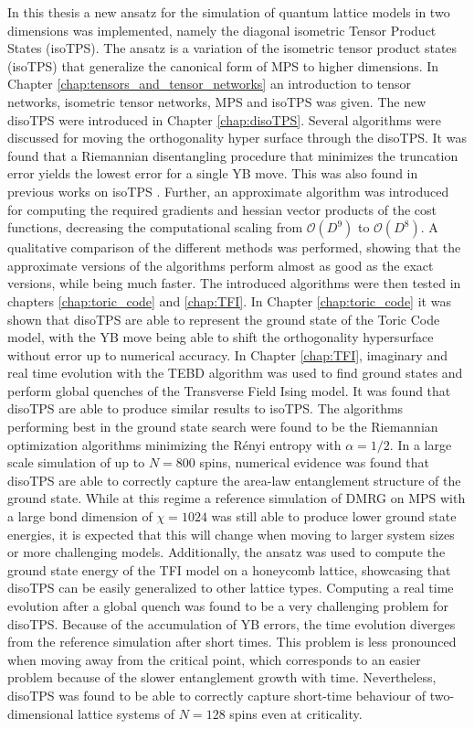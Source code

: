 In this thesis a new ansatz for the simulation of quantum lattice models in two dimensions was implemented, namely the diagonal isometric Tensor Product States (isoTPS). The ansatz is a variation of the isometric tensor product states (isoTPS) that generalize the canonical form of MPS to higher dimensions. In Chapter \ref{chap:tensors_and_tensor_networks} an introduction to tensor networks, isometric tensor networks, MPS and isoTPS was given. The new disoTPS were introduced in Chapter \ref{chap:disoTPS}. Several algorithms were discussed for moving the orthogonality hyper	surface through the disoTPS. It was found that a Riemannian disentangling procedure that minimizes the truncation error yields the lowest error for a single YB move. This was also found in previous works on isoTPS \cite{cite:isometric_tensor_network_states_in_two_dimensions, cite:efficient_simulation_of_dynamics_in_two_dimensional_quantum_spin_systems}. Further, an approximate algorithm was introduced for computing the required gradients and hessian vector products of the cost functions, decreasing the computational scaling from $\mathcal{O}(D^9)$ to $\mathcal{O}(D^8)$. A qualitative comparison of the different methods was performed, showing that the approximate versions of the algorithms perform almost as good as the exact versions, while being much faster. The introduced algorithms were then tested in chapters \ref{chap:toric_code} and \ref{chap:TFI}. In Chapter \ref{chap:toric_code} it was shown that disoTPS are able to represent the ground state of the Toric Code model, with the YB move being able to shift the orthogonality hypersurface without error up to numerical accuracy. In Chapter \ref{chap:TFI}, imaginary and real time evolution with the TEBD algorithm was used to find ground states and perform global quenches of the Transverse Field Ising model. It was found that disoTPS are able to produce similar results to isoTPS. The algorithms performing best in the ground state search were found to be the Riemannian optimization algorithms minimizing the Rényi entropy with $\alpha = 1/2$. In a large scale simulation of up to $N = 800$ spins, numerical evidence was found that disoTPS are able to correctly capture the area-law entanglement structure of the ground state. While at this regime a reference simulation of DMRG on MPS with a large bond dimension of $\chi = 1024$ was still able to produce lower ground state energies, it is expected that this will change when moving to larger system sizes or more challenging models. Additionally, the ansatz was used to compute the ground state energy of the TFI model on a honeycomb lattice, showcasing that disoTPS can be easily generalized to other lattice types. Computing a real time evolution after a global quench was found to be a very challenging problem for disoTPS. Because of the accumulation of YB errors, the time evolution diverges from the reference simulation after short times. This problem is less pronounced when moving away from the critical point, which corresponds to an easier problem because of the slower entanglement growth with time. Nevertheless, disoTPS was found to be able to correctly capture short-time behaviour of two-dimensional lattice systems of $N = 128$ spins even at criticality. \par
